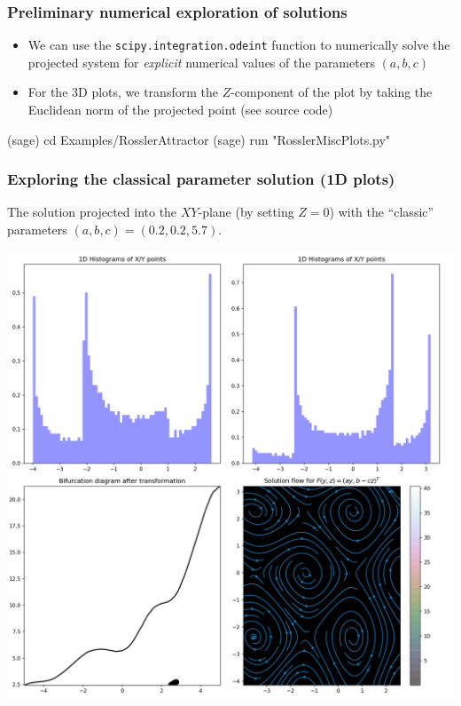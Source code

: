 \documentclass[usenames,svgnames,dvipsnames,10pt]{beamer}
\begin{document}
\begin{frame}[fragile]
\frametitle{Preliminary numerical exploration of solutions}

\begin{itemize} 

\item We can use the \texttt{scipy.integration.odeint} function to numerically solve the projected system 
      for \emph{explicit} numerical values of the parameters $(a, b, c)$ 
\item For the 3D plots, we transform the $Z$-component of the plot by taking the Euclidean norm of the projected point (see source code)

\end{itemize} 

\begin{center}
\begin{code}
(sage) cd Examples/RosslerAttractor
(sage) run "RosslerMiscPlots.py"
\end{code}
\end{center}

\end{frame}

\begin{frame}[fragile]
\frametitle{Exploring the classical parameter solution (1D plots)}

The solution projected into the $XY$-plane (by setting $Z=0$) with the ``classic'' 
parameters $(a, b, c) = (0.2, 0.2, 5.7)$. \\ 
\begin{center}
\includegraphics[height=0.75\textheight]{../Images/RosslerAttractorSummary-TypeXY-Plot1D-A0-200B0-200C5-700-2021-10-27-044726.png}
\end{center}

\end{frame}
\end{document}
